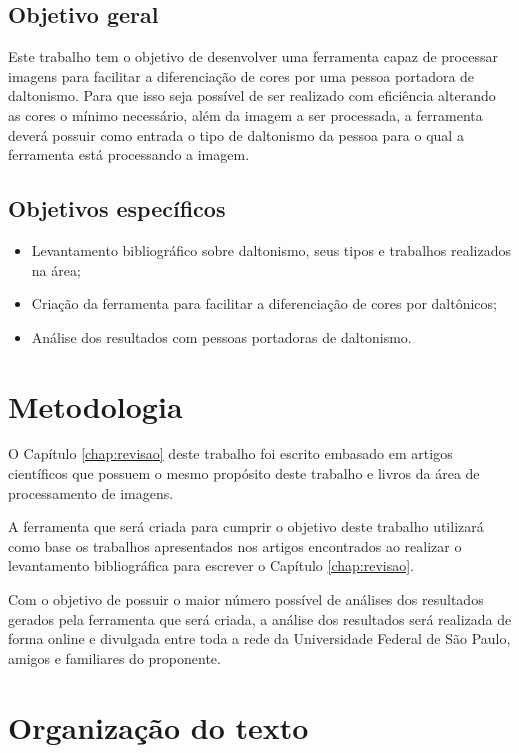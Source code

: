 \documentclass[	12pt, Times, openright, twoside, a4paper, english, brazil]{abntex2}
\begin{document}
\subsection{Objetivo geral}

Este trabalho tem o objetivo de desenvolver uma ferramenta capaz de processar imagens para facilitar a diferenciação de cores por uma pessoa portadora de daltonismo. Para que isso seja possível de ser realizado com eficiência alterando as cores o mínimo necessário, além da imagem a ser processada, a ferramenta deverá possuir como entrada o tipo de daltonismo da pessoa para o qual a ferramenta está processando a imagem.

\subsection{Objetivos específicos}

\begin{itemize}
\item Levantamento bibliográfico sobre daltonismo, seus tipos e trabalhos realizados na área;
\item Criação da ferramenta para facilitar a diferenciação de cores por daltônicos;
\item Análise dos resultados com pessoas portadoras de daltonismo.
\end{itemize}

\section{Metodologia}

O Capítulo \ref{chap:revisao} deste trabalho foi escrito embasado em artigos científicos que possuem o mesmo propósito deste trabalho e livros da área de processamento de imagens.

A ferramenta que será criada para cumprir o objetivo deste trabalho utilizará como base os trabalhos apresentados nos artigos encontrados ao realizar o levantamento bibliográfica para escrever o Capítulo \ref{chap:revisao}.

Com o objetivo de possuir o maior número possível de análises dos resultados gerados pela ferramenta que será criada, a análise dos resultados será realizada de forma online e divulgada entre toda a rede da Universidade Federal de São Paulo, amigos e familiares do proponente.

\section{Organização do texto}
\end{document}
